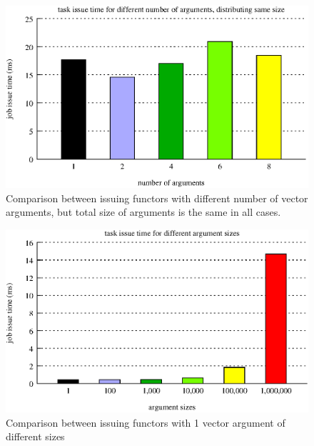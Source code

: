 \begin{figure}[!ht]
\includegraphics[width=0.7\columnwidth]{figures/job_issue_time_different_argnums_same_size_bars}
\caption{Comparison between issuing functors with different number of vector arguments, but total 
				size of arguments is the same in all cases.}
\label{fig:issue_time_different_argnum_same_size}
\end{figure}


\begin{figure}[!ht]
\includegraphics[width=0.7\columnwidth]{figures/job_issue_time_different_argsizes}
\caption{Comparison between issuing functors with 1 vector argument of different sizes}
\label{fig:job_issue_time_different_argsizes}
\end{figure}

